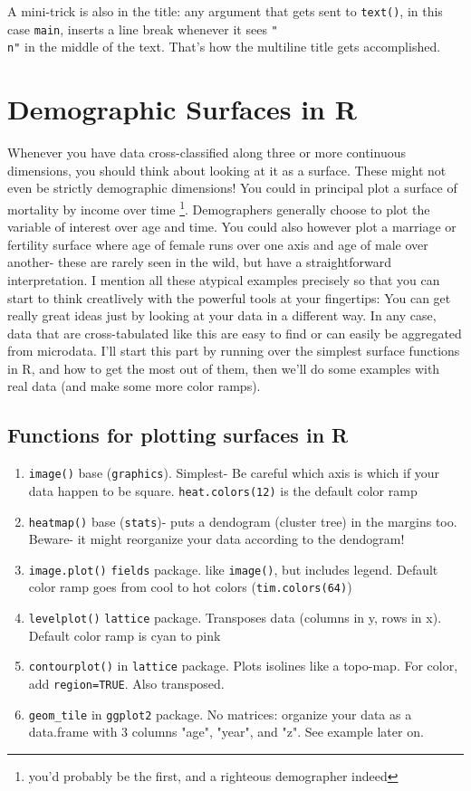 \documentclass[a4paper]{article}
\begin{document}
A mini-trick is also in the title: any argument that gets sent to \texttt{text()}, in this case \texttt{main}, inserts a line break whenever it sees \texttt{"\\n"} in the middle of the text. That's how the multiline title gets accomplished.
% 
\section{Demographic Surfaces in R}
Whenever you have data cross-classified along three or more continuous dimensions, you should think about looking at it as a surface. These might not even be strictly demographic dimensions! You could in principal plot a surface of mortality by income over time \footnote{you'd probably be the first, and a righteous demographer indeed}. Demographers generally choose to plot the variable of interest over age and time. You could also however plot a marriage or fertility surface where age of female runs over one axis and age of male over another- these are rarely seen in the wild, but have a straightforward interpretation. I mention all these atypical examples precisely so that you can start to think creatlively with the powerful tools at your fingertips: You can get really great ideas just by looking at your data in a different way. In any case, data that are cross-tabulated like this are easy to find or can easily be aggregated from microdata.  I'll start this part by running over the simplest surface functions in R, and how to get the most out of them, then we'll do some examples with real data (and make some more color ramps).

\subsection{Functions for plotting surfaces in R}

\begin{enumerate}
\item{\texttt{image()}} base (\texttt{graphics}). Simplest- Be careful which axis is which if your data happen to be square. \texttt{heat.colors(12)} is the default color ramp
\item{\texttt{heatmap()}} base (\texttt{stats})- puts a dendogram (cluster tree) in the margins too. Beware- it might reorganize your data according to the dendogram!
\item{\texttt{image.plot()}} \texttt{fields} package. like \texttt{image()}, but includes legend. Default color ramp goes from cool to hot colors (\texttt{tim.colors(64)})
\item{\texttt{levelplot()}} \texttt{lattice} package. Transposes data (columns in y, rows in x). Default color ramp is cyan to pink
\item{\texttt{contourplot()}} in \texttt{lattice} package. Plots isolines like a topo-map. For color, add \texttt{region=TRUE}. Also transposed.
\item{\texttt{geom\_tile}} in \texttt{ggplot2} package. No matrices: organize your data as a data.frame with 3 columns "age", "year", and "z". See example later on.
\end{enumerate}
\end{document}
